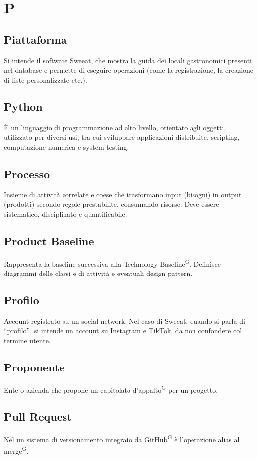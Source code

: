 \section{P}

\subsection{Piattaforma} Si intende il software Sweeat, che mostra la guida dei locali gastronomici presenti nel database e permette di eseguire operazioni (come la registrazione, la creazione di liste personalizzate etc.).

\subsection{Python} 
È un linguaggio di programmazione ad alto livello, orientato agli oggetti, utilizzato per diversi usi, tra cui sviluppare applicazioni distribuite, scripting, computazione numerica e system testing. 

\subsection{Processo}
Insieme di attività correlate e coese che trasformano input (bisogni) in output (prodotti) secondo regole prestabilite, consumando risorse. Deve essere sistematico, disciplinato e quantificabile.

\subsection{Product Baseline}
Rappresenta la baseline successiva alla Technology Baseline\textsuperscript{G}. Definisce diagrammi delle classi e di attività e eventuali design pattern. 

\subsection{Profilo} Account registrato su un social network. Nel caso di Sweeat, quando si parla di “profilo”, si intende un account su Instagram e TikTok, da non confondere col termine utente.

\subsection{Proponente}
Ente o azienda che propone un capitolato d’appalto\textsuperscript{G} per un progetto.

\subsection{Pull Request}
Nel un sistema di versionamento integrato da GitHub\textsuperscript{G} è l'operazione alias al merge\textsuperscript{G}.

\clearpage
